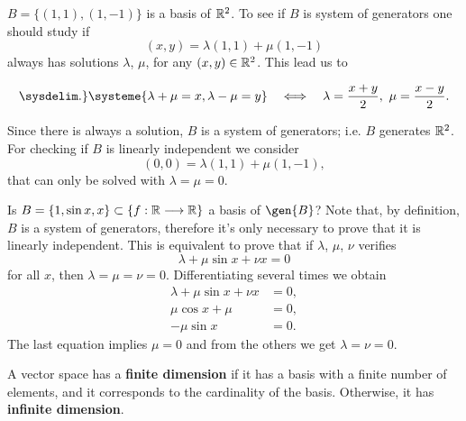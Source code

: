 \begin{example}
    $B = \{\left( 1, 1 \right), \left( 1, -1 \right) \} $ is a basis of $\mathbb{R}^2$. To see if $B$ is system of
    generators one should study if
    \begin{equation}
        \left( x, y \right) = \lambda\left( 1, 1 \right) + \mu\left( 1, -1 \right)
    \end{equation}
    always has solutions $\lambda$, $\mu$, for any $\left( x, y \right) \in\mathbb{R}^2$. This lead us to

    \begin{equation}
        \sysdelim.\}\systeme{\lambda + \mu = x,\lambda - \mu = y} \quad\iff\quad \lambda = \frac{x + y}{2},\ \mu =
            \frac{x - y}{2}.
    \end{equation}

    Since there is always a solution, $B$ is a system of generators; i.e. $B$ generates $\mathbb{R}^2$. For checking
    if $B$ is linearly independent we consider
    \begin{equation}
        \left( 0, 0 \right) = \lambda\left( 1, 1 \right) + \mu\left( 1, -1 \right),
    \end{equation}
    that can only be solved with $\lambda = \mu = 0$.
\end{example}

\begin{example}
    Is $B = \{1, \sin x, x\}\subset \{f : \mathbb{R}\longrightarrow \mathbb{R}\}$ a basis of $\gen{B}$? Note that, by definition,
    $B$ is a system of generators, therefore it's only necessary to prove that it is linearly independent.
    This is equivalent to prove that if $\lambda$, $\mu$, $\nu$ verifies
    \begin{equation}
        \lambda + \mu\sin x + \nu x = 0
    \end{equation}
    for all $x$, then $\lambda = \mu = \nu = 0$. Differentiating several times we obtain
    \begin{align}
        \lambda + \mu\sin x + \nu x &= 0, \\
        \mu\cos x + \mu &= 0, \\
        -\mu\sin x &= 0.
    \end{align}
    The last equation implies $\mu = 0$ and from the others we get $\lambda = \nu = 0$.
\end{example}

\begin{defi}[Dimension]
    A vector space has a \textbf{finite dimension} if it has a basis with a finite number of elements, and
    it corresponds to the cardinality of the basis.
    Otherwise, it has \textbf{infinite dimension}.
\end{defi}

